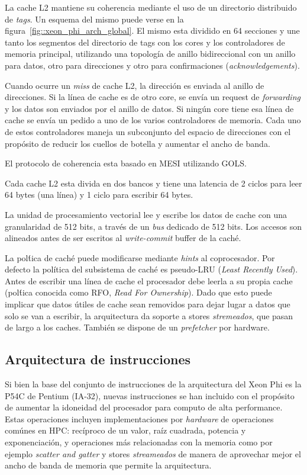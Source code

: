 La cache L2 mantiene su coherencia mediante el uso de un directorio distribuido de \textit{tags}. Un esquema del mismo puede
verse en la figura~\ref{fig::xeon_phi_arch_global}. El mismo esta dividido en 64 secciones y une tanto los segmentos del
directorio de tags con los cores y los controladores de memoria principal, utilizando una topolog\'ia de anillo bidireccional
con un anillo para datos, otro para direcciones y otro para confirmaciones (\textit{acknowledgements}).

Cuando ocurre un \textit{miss} de cache L2, la direcci\'on es enviada al anillo de direcciones. Si la l\'inea de cache
es de otro core, se env\'ia un request de \textit{forwarding} y los datos son enviados por el anillo de datos. Si ning\'un
core tiene esa l\'inea de cache se env\'ia un pedido a uno de los varios controladores de memoria. Cada uno de estos controladores
maneja un subconjunto del espacio de direcciones con el prop\'osito de reducir los cuellos de botella y aumentar el ancho de banda.

El protocolo de coherencia esta basado en MESI utilizando GOLS.

Cada cache L2 esta divida en dos bancos y tiene una latencia de 2 ciclos para leer 64 bytes (una l\'inea) y 1 ciclo para escribir 64 bytes.

La unidad de procesamiento vectorial lee y escribe los datos de cache con una granularidad de 512 bits, a trav\'es de un
\textit{bus} dedicado de 512 bits. Los accesos son alineados antes de ser escritos al \textit{write-commit} buffer de la
cach\'e.

La pol\'tica de cach\'e puede modificarse mediante \textit{hints} al coprocesador. Por defecto la pol\'itica del subsistema
de cach\'e es pseudo-LRU (\textit{Least Recently Used}). Antes de escribir una l\'inea de cache el procesador debe leerla a su propia
cache (pol\'tica conocida como RFO, \textit{Read For Ownership}). Dado que esto puede implicar que datos \'utiles de cache
sean removidos para dejar lugar a datos que solo se van a escribir, la arquitectura da soporte a stores \textit{stremeados},
que pasan de largo a los caches. Tambi\'en se dispone de un \textit{prefetcher} por hardware.

\subsection{Arquitectura de instrucciones}

Si bien la base del conjunto de instrucciones de la arquitectura del Xeon Phi es la P54C de Pentium (IA-32), nuevas instrucciones
se han incluido con el prop\'osito de aumentar la idoneidad del procesador para computo de alta performance. 
Estas operaciones incluyen implementaciones por \textit{hardware} de operaciones com\'unes en HPC: rec\'iproco de un valor, 
ra\'iz cuadrada, potencia y exponenciaci\'on, y operaciones m\'as relacionadas con la memoria como por ejemplo \textit{scatter and gatter} 
y stores \textit{streameados} de manera de aprovechar mejor el ancho de banda de memoria que permite la arquitectura.

